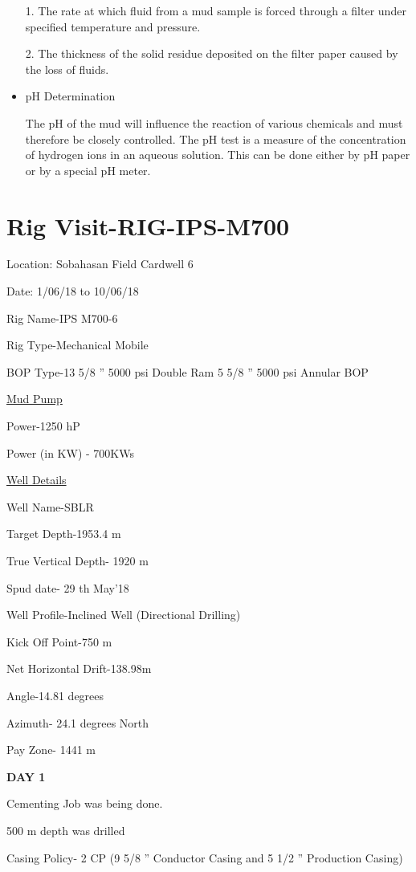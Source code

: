 \documentclass[11pt,a4paper]{article}
\begin{document}
\begin{itemize}
1. The rate at which fluid from a mud sample is forced through a filter under specified temperature and pressure.

2. The thickness of the solid residue deposited on the filter paper caused by the loss of fluids.

\item pH Determination

The pH of the mud will influence the reaction of various chemicals and must therefore be closely controlled. The pH test is a measure of the concentration of hydrogen ions in an aqueous solution. This can be done either by pH paper or by a special pH meter.

\end{itemize}
 
\section{\textbf{Rig Visit-RIG-IPS-M700}}

Location: Sobahasan Field Cardwell 6

Date: 1/06/18 to 10/06/18

Rig Name-IPS M700-6

Rig Type-Mechanical Mobile

BOP Type-13 5/8 ” 5000 psi Double Ram \hfill 5 5/8 ” 5000 psi Annular BOP

\underline{Mud Pump}

Power-1250 hP

Power (in KW) - 700KWs

\underline{Well Details}

Well Name-SBLR

Target Depth-1953.4 m

True Vertical Depth- 1920 m

Spud date- 29 th May’18

Well Profile-Inclined Well (Directional Drilling)

Kick Off Point-750 m

Net Horizontal Drift-138.98m

Angle-14.81 degrees

Azimuth- 24.1 degrees North

Pay Zone- 1441 m

\textbf{DAY \hfill 1}

Cementing Job was being done.

500 m depth was drilled

Casing Policy- 2 CP (9 5/8 ” Conductor Casing and 5 1/2 ” Production Casing)
\end{document}

